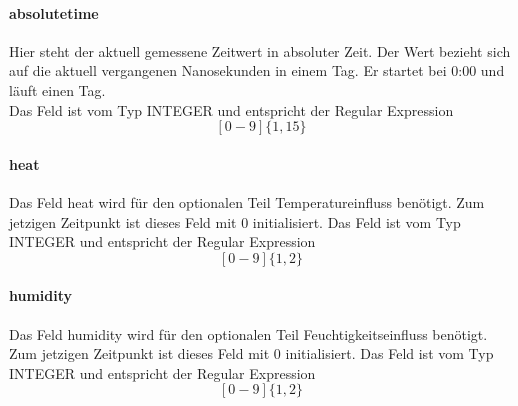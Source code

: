     \paragraph{absolutetime}
    Hier steht der aktuell gemessene Zeitwert in absoluter Zeit. Der Wert bezieht sich auf die aktuell vergangenen Nanosekunden in einem Tag. Er startet bei 0:00 und läuft einen Tag.\\
    Das Feld ist vom Typ INTEGER und entspricht der Regular Expression
    $$[0-9]\{1,15\}$$
    \paragraph{heat}
    Das Feld heat wird für den optionalen Teil Temperatureinfluss benötigt. Zum jetzigen Zeitpunkt ist dieses Feld mit 0 initialisiert.
    Das Feld ist vom Typ INTEGER und entspricht der Regular Expression
    $$[0-9]\{1,2\}$$
    \paragraph{humidity}
    Das Feld humidity wird für den optionalen Teil Feuchtigkeitseinfluss benötigt. Zum jetzigen Zeitpunkt ist dieses Feld mit 0 initialisiert.
    Das Feld ist vom Typ INTEGER und entspricht der Regular Expression
    $$[0-9]\{1,2\}$$
